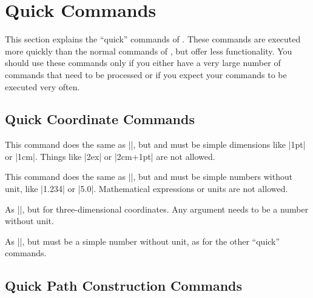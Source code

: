 %
%
%


\section{Quick Commands}

This section explains the ``quick'' commands of \pgfname. These commands are
executed more quickly than the normal commands of \pgfname, but offer less
functionality. You should use these commands only if you either have a very
large number of commands that need to be processed or if you expect your
commands to be executed very often.


\subsection{Quick Coordinate Commands}

\begin{command}{\pgfqpoint{}}
    This command does the same as |\pgfpoint|, but  and  must
    be simple dimensions like |1pt| or |1cm|. Things like |2ex| or |2cm+1pt|
    are not allowed.
\end{command}

\begin{command}{\pgfqpointxy{}}
    This command does the same as |\pgfpointxy|, but  and
     must be simple numbers without unit, like |1.234| or |5.0|.
    Mathematical expressions or units are not allowed.
\end{command}

\begin{command}{\pgfqpointxyz{}}
    As |\pgfqpointxy|, but for three-dimensional coordinates. Any argument
    needs to be a number without unit.
\end{command}

\begin{command}{\pgfqpointscale{}}
    As |\pgfpointscale|, but  must be a simple number without
    unit, as for the other ``quick'' commands.
\end{command}


\subsection{Quick Path Construction Commands}

